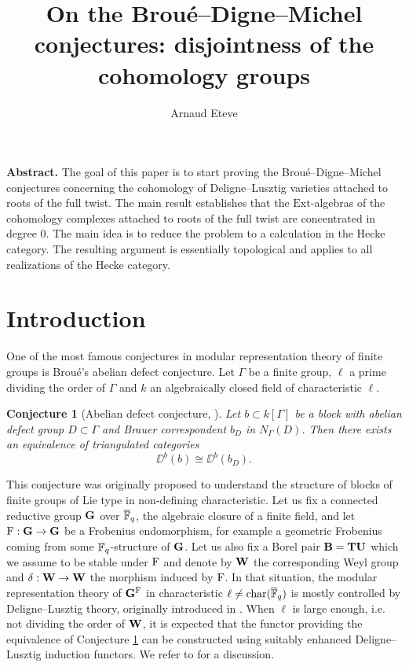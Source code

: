 \documentclass[article, 10pt, oneside, reqno]{amsart}
\title[Disjointness of cohomology groups]{On the Broué--Digne--Michel conjectures: disjointness of the cohomology groups}
\author{Arnaud Eteve}
\theoremstyle{plain}
\newtheorem{conj}[thm]{Conjecture}
\theoremstyle{definition}
\theoremstyle{remark}
\begin{document}
\maketitle

\noindent\textbf{Abstract.} The goal of this paper is to start proving the Broué--Digne--Michel conjectures concerning the cohomology of Deligne--Lusztig varieties attached to roots of the full twist. The main result establishes that the $\mathrm{Ext}$-algebras of the cohomology complexes attached to roots of the full twist are concentrated in degree $0$. The main idea is to reduce the problem to a calculation in the Hecke category. The resulting argument is essentially topological and applies to all realizations of the Hecke category. 

\tableofcontents

\section{Introduction}

One of the most famous conjectures in modular representation theory of finite groups is Broué's abelian defect conjecture. 
Let $\Gamma$ be a finite group, $\ell$ a prime dividing the order of $\Gamma$ and $k$ an algebraically closed field of characteristic $\ell$.

\begin{conj}[Abelian defect conjecture, \cite{BroueIsometrieParfaites}]\label{conj:abelian-defect}
Let $b \subset k[\Gamma]$ be a block with abelian defect group $D \subset \Gamma$ and Brauer correspondent $b_{D}$ in $N_{\Gamma}(D)$. Then there exists an equivalence of triangulated categories 
$$\DD^b(b) \cong \DD^b(b_D).$$
\end{conj}

This conjecture was originally proposed to understand the structure of blocks of finite groups of Lie type in non-defining characteristic. Let us fix a connected reductive group $\mathbf{G}$ over $\overline{\mathbb{F}}_q$, the algebraic closure of a finite field, and let $\mathrm{F} : \mathbf{G} \to \mathbf{G}$ be a Frobenius endomorphism, for example a geometric Frobenius coming from some $\mathbb{F}_q$-structure of $\mathbf{G}$. Let us also fix a Borel pair $\mathbf{B} = \mathbf{T}\mathbf{U}$ which we assume to be stable under $\mathrm{F}$ and denote by $\mathbf{W}$ the corresponding Weyl group and $\delta : \mathbf{W} \to \mathbf{W}$ the morphism induced by $\mathrm{F}$. In that situation, the modular representation theory of $\mathbf{G}^{\mathrm{F}}$ in characteristic $\ell \neq \mathrm{char}(\overline{\mathbb{F}}_q)$ is mostly controlled by Deligne--Lusztig theory, originally introduced in \cite{DeligneLusztig}. When $\ell$ is large enough, i.e. not dividing the order of $\mathbf{W}$, it is expected that the functor providing the equivalence of Conjecture \ref{conj:abelian-defect} can be constructed using suitably enhanced Deligne--Lusztig induction functors. We refer to \cite[Chapter VI]{BroueReflectionGroupsLectures} for a discussion.
\end{document}
